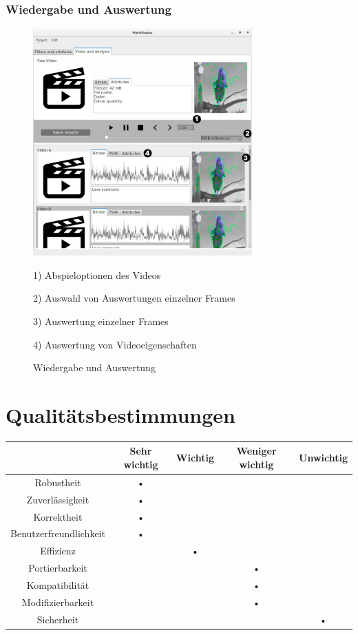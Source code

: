 \documentclass[parskip=full]{scrartcl}
\begin{document}
\subsubsection{Wiedergabe und Auswertung}
\begin{figure}[htbp]
\centering
\includegraphics[width=0.75\textwidth]{ToViET/Screenshots/GUI_Videoanalysis}
\caption{Wiedergabe und Auswertung}
\begin{flushleft}
\item 1) Abspieloptionen des Videos
\item 2) Auswahl von Auswertungen einzelner Frames
\item 3) Auswertung einzelner Frames
\item 4) Auswertung von Videoeigenschaften 
\end{flushleft}
\end{figure}
\newpage
\section{Qualitätsbestimmungen}
\begin{tabular}{|c|c|c|c|c|}
\hline & Sehr wichtig & Wichtig & Weniger wichtig & Unwichtig \\
\hline Robustheit & • &  &  & \\ 
\hline Zuverlässigkeit & • &  &  & \\ 
\hline Korrektheit & • &  &  & \\ 
\hline Benutzerfreundlichkeit & • &  &  & \\ 
\hline Effizienz &  & • &  & \\ 
\hline Portierbarkeit &  &  & • & \\ 
\hline Kompatibilität &  &  & • & \\ 
\hline Modifizierbarkeit &  &  & • & \\ 
\hline Sicherheit &  &  &  & • \\ 
\hline 
\end{tabular} 
\newpage
\end{document}
